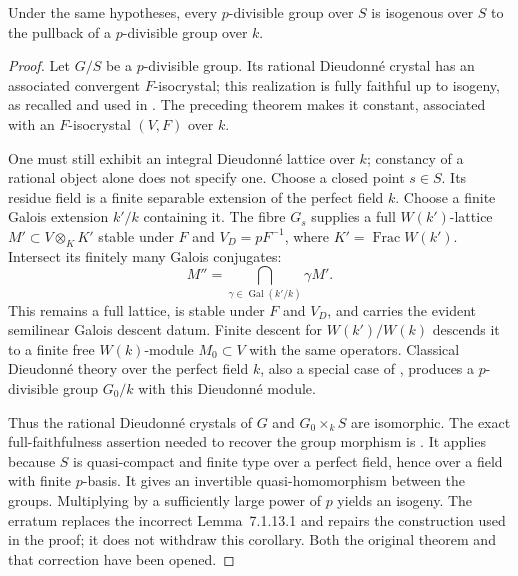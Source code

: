 \begin{corollary}\label{cor:DE-BT-constant}
Under the same hypotheses, every $p$-divisible group over $S$ is isogenous over $S$ to the pullback of a $p$-divisible group over $k$.
\end{corollary}
\begin{proof}
Let $G/S$ be a $p$-divisible group.  Its rational Dieudonn\'e crystal has an associated convergent $F$-isocrystal; this realization is fully faithful up to isogeny, as recalled and used in \cite[\S5, pp.~50--51, and \S5.3]{DeJong1995}.  The preceding theorem makes it constant, associated with an $F$-isocrystal $(V,F)$ over $k$.

One must still exhibit an integral Dieudonn\'e lattice over $k$; constancy of a rational object alone does not specify one.  Choose a closed point $s\in S$.  Its residue field is a finite separable extension of the perfect field $k$.  Choose a finite Galois extension $k'/k$ containing it.  The fibre $G_s$ supplies a full $W(k')$-lattice
$M'\subset V\otimes_K K'$ stable under $F$ and $V_D=pF^{-1}$, where $K'=\operatorname{Frac}W(k')$.  Intersect its finitely many Galois conjugates:
\[
                  M''=\bigcap_{\gamma\in\operatorname{Gal}(k'/k)}\gamma M'.
\]
This remains a full lattice, is stable under $F$ and $V_D$, and carries the evident semilinear Galois descent datum.  Finite \etale descent for $W(k')/W(k)$ descends it to a finite free $W(k)$-module $M_0\subset V$ with the same operators.  Classical Dieudonn\'e theory over the perfect field $k$, also a special case of \cite[Theorem~4.1.1]{DeJong1995}, produces a $p$-divisible group $G_0/k$ with this Dieudonn\'e module.

Thus the rational Dieudonn\'e crystals of $G$ and $G_0\times_k S$ are isomorphic.  The exact full-faithfulness assertion needed to recover the group morphism is \cite[Corollary~5.1.2, formula~(5.1.2.1)]{DeJong1995}.  It applies because $S$ is quasi-compact and finite type over a perfect field, hence over a field with finite $p$-basis.  It gives an invertible quasi-homomorphism between the groups.  Multiplying by a sufficiently large power of $p$ yields an isogeny.  The erratum \cite{DeJong1998Erratum} replaces the incorrect Lemma~7.1.13.1 and repairs the construction used in the proof; it does not withdraw this corollary.  Both the original theorem and that correction have been opened.
\end{proof}

